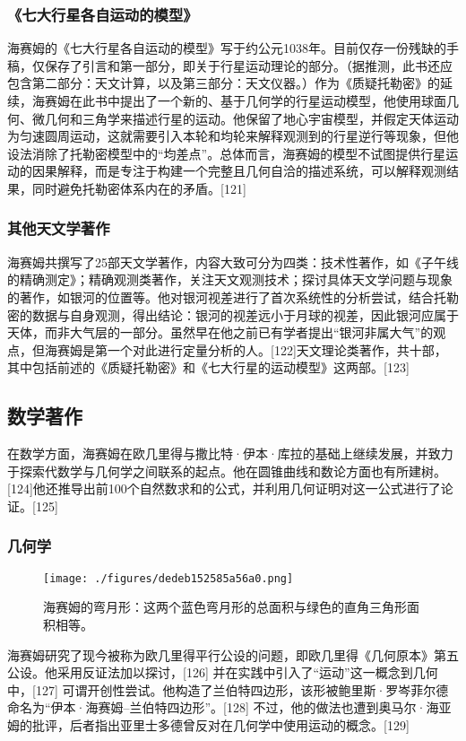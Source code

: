 \subsubsection{《七大行星各自运动的模型》}
海赛姆的《七大行星各自运动的模型》写于约公元1038年。目前仅存一份残缺的手稿，仅保存了引言和第一部分，即关于行星运动理论的部分。（据推测，此书还应包含第二部分：天文计算，以及第三部分：天文仪器。）作为《质疑托勒密》的延续，海赛姆在此书中提出了一个新的、基于几何学的行星运动模型，他使用球面几何、微几何和三角学来描述行星的运动。他保留了地心宇宙模型，并假定天体运动为匀速圆周运动，这就需要引入本轮和均轮来解释观测到的行星逆行等现象，但他设法消除了托勒密模型中的“均差点”。总体而言，海赛姆的模型不试图提供行星运动的因果解释，而是专注于构建一个完整且几何自洽的描述系统，可以解释观测结果，同时避免托勒密体系内在的矛盾。[121]
\subsubsection{其他天文学著作}
海赛姆共撰写了25部天文学著作，内容大致可分为四类：技术性著作，如《子午线的精确测定》；精确观测类著作，关注天文观测技术；探讨具体天文学问题与现象的著作，如银河的位置等。他对银河视差进行了首次系统性的分析尝试，结合托勒密的数据与自身观测，得出结论：银河的视差远小于月球的视差，因此银河应属于天体，而非大气层的一部分。虽然早在他之前已有学者提出“银河非属大气”的观点，但海赛姆是第一个对此进行定量分析的人。[122]天文理论类著作，共十部，其中包括前述的《质疑托勒密》和《七大行星的运动模型》这两部。[123]
\subsection{数学著作}
在数学方面，海赛姆在欧几里得与撒比特·伊本·库拉的基础上继续发展，并致力于探索代数学与几何学之间联系的起点。他在圆锥曲线和数论方面也有所建树。[124]他还推导出前100个自然数求和的公式，并利用几何证明对这一公式进行了论证。[125]
\subsubsection{几何学}
\begin{figure}[ht]
\centering
\texttt{[image: ./figures/dedeb152585a56a0.png]}
\caption{海赛姆的弯月形：这两个蓝色弯月形的总面积与绿色的直角三角形面积相等。} \label{fig_YBH_4}
\end{figure}
海赛姆研究了现今被称为欧几里得平行公设的问题，即欧几里得《几何原本》第五公设。他采用反证法加以探讨，[126] 并在实践中引入了“运动”这一概念到几何中，[127] 可谓开创性尝试。他构造了兰伯特四边形，该形被鲍里斯·罗岑菲尔德命名为“伊本·海赛姆–兰伯特四边形”。[128]
不过，他的做法也遭到奥马尔·海亚姆的批评，后者指出亚里士多德曾反对在几何学中使用运动的概念。[129]

